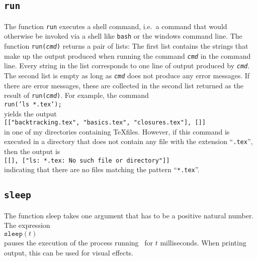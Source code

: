 \subsection{\texttt{run}}
The function \texttt{run} executes a shell command, i.e.~a command that would otherwise be
invoked via a shell like \texttt{bash} or the windows command line.  The function \texttt{run(\textsl{cmd})} returns a pair
of lists: The first list contains the strings that make up the output produced when running the
command  \texttt{\textsl{cmd}} in the command line.  Every string in the list corresponds to one line
of output produced by  \texttt{\textsl{cmd}}. 
 The second list is empty as long as   \texttt{\textsl{cmd}} does not produce any error messages.
 If there are error messages, these are collected in the second list returned as the result of   \texttt{run(\textsl{cmd})}.
For example, the command
\\[0.2cm]
\hspace*{1.3cm}
\texttt{run('ls *.tex');}
\\[0.2cm]
yields the output
\\[0.2cm]
\hspace*{1.3cm}
\texttt{[["backtracking.tex", "basics.tex", "closures.tex"], []]}
\\[0.2cm]
in one of my directories containing \TeX files.  However, if this command is executed in a
directory that does not contain any file with the extension ``\texttt{.tex}'', then the output is
\\[0.2cm]
\hspace*{1.3cm}
\texttt{[[], ["ls: *.tex: No such file or directory"]]}
\\[0.2cm]
indicating that there are no files matching the pattern ``\texttt{*.tex}''.

\subsection{\texttt{sleep}}
The function sleep takes one argument that has to be a positive natural number.  The expression
\\[0.2cm]
\hspace*{1.3cm}
$\texttt{sleep}(t)$
\\[0.2cm]
pauses the execution of the process running \setlx\ for $t$ milliseconds.  When printing
output, this can be used for visual effects.


